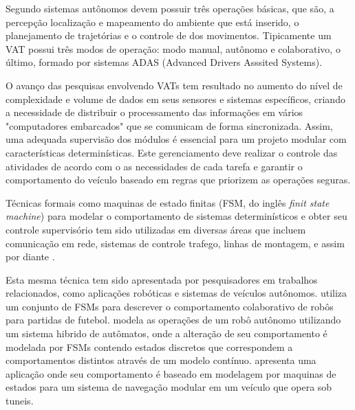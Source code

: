 \documentclass[conference]{IEEEtran}
\begin{document}
Segundo \cite{autonomous_siegwart2011introduction} sistemas autônomos devem possuir três operações básicas, que são, a percepção localização e mapeamento do ambiente que está inserido, o planejamento de trajetórias e o controle de dos movimentos. Tipicamente um VAT possui três modos de operação: modo manual, autônomo e colaborativo, o último, formado por sistemas ADAS (Advanced Drivers Asssited Systems).

O avanço das pesquisas envolvendo VATs tem resultado no aumento do nível de complexidade e volume de dados em seus sensores e sistemas específicos, criando a necessidade de distribuir o processamento das informações em vários "computadores embarcados" que se comunicam de forma sincronizada. Assim, uma adequada supervisão dos módulos é essencial para um projeto modular com características determinísticas. Este gerenciamento deve realizar o controle das atividades de acordo com o as necessidades de cada tarefa e garantir o comportamento do veículo baseado em regras que priorizem as operações seguras.


Técnicas formais como maquinas de estado finitas (FSM, do inglês \textit{finit state machine}) para modelar o comportamento de sistemas determinísticos e obter seu controle supervisório tem sido utilizadas em diversas áreas que incluem comunicação em rede, sistemas de controle trafego, linhas de montagem, e assim por diante \cite{event_comparative_study} \cite{event_des_line_945770}. 

Esta mesma técnica tem sido apresentada por pesquisadores em trabalhos relacionados, como aplicações robóticas e sistemas de veículos autônomos. \cite{event_supervisory_soccer_994642} utiliza um conjunto de FSMs para descrever o comportamento colaborativo de robôs para partidas de futebol. \cite{event_hybrid_automata_827799} modela as operações de um robô autônomo utilizando um sistema hibrido de autômatos, onde a alteração de seu comportamento é modelada por FSMs contendo estados discretos que correspondem a comportamentos distintos através de um modelo contínuo. \cite{event_modular_navigation} apresenta uma aplicação onde seu comportamento é baseado em modelagem por maquinas de estados para um sistema de navegação modular em um veículo que opera sob tuneis.
\end{document}

